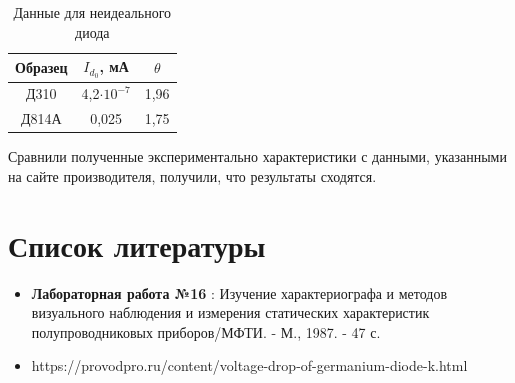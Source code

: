 \documentclass[a4paper, 12pt]{article}
\begin{document}
\begin{table}[h]
\centering
\begin{tabular}{|c|c|c|}
\hline
Образец & $I_{d_0}$, мА  & $\theta$ \\ \hline
Д310    & 4,2$\cdot 10^{-7}$ & 1,96 \\ \hline
Д814А    & 0,025 & 1,75 \\ \hline
\end{tabular}
\caption{Данные для неидеального диода}
\end{table}
Сравнили полученные экспериментально характеристики с данными, указанными на сайте производителя, получили, что результаты сходятся.

\section{Список литературы}
\begin{itemize}
    \item \textbf{Лабораторная работа №16 }: Изучение характериографа и методов визуального наблюдения и измерения статических характеристик полупроводниковых приборов/МФТИ. - М., 1987. - 47 с.
    \item  https://provodpro.ru/content/voltage-drop-of-germanium-diode-k.html
\end{itemize}
\end{document}
